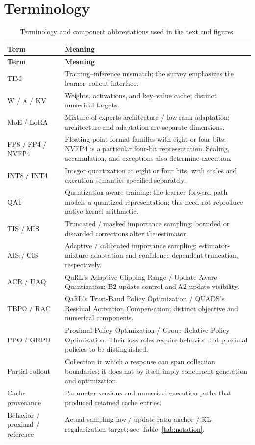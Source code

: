 \section{Terminology}\label{app:terms}
\begingroup\small
\begin{longtable}{@{}P{35mm}P{123mm}@{}}
\caption{Terminology and component abbreviations used in the text and figures.}\label{tab:terms}\\
\toprule {} \textbf{Term} & \textbf{Meaning}\\\midrule\endfirsthead
\toprule {} \textbf{Term} & \textbf{Meaning}\\\midrule\endhead
\bottomrule\endlastfoot
TIM & Training--inference mismatch; the survey emphasizes the learner--rollout interface.\\[4pt]
W / A / KV & Weights, activations, and key--value cache; distinct numerical targets.\\[4pt]
MoE / LoRA & Mixture-of-experts architecture / low-rank adaptation; architecture and adaptation are separate dimensions.\\[4pt]
FP8 / FP4 / NVFP4 & Floating-point format families with eight or four bits; NVFP4 is a particular four-bit representation. Scaling, accumulation, and exceptions also determine execution.\\[4pt]
INT8 / INT4 & Integer quantization at eight or four bits, with scales and execution semantics specified separately.\\[4pt]
QAT & Quantization-aware training: the learner forward path models a quantized representation; this need not reproduce native kernel arithmetic.\\[4pt]
TIS / MIS & Truncated / masked importance sampling; bounded or discarded corrections alter the estimator.\\[4pt]
AIS / CIS & Adaptive / calibrated importance sampling: estimator-mixture adaptation and confidence-dependent truncation, respectively.\\[4pt]
ACR / UAQ & QuRL's Adaptive Clipping Range / Update-Aware Quantization; B2 update control and A2 update visibility.\\[4pt]
TBPO / RAC & QaRL's Trust-Band Policy Optimization / QUADS's Residual Activation Compensation; distinct objective and numerical components.\\[4pt]
PPO / GRPO & Proximal Policy Optimization / Group Relative Policy Optimization. Their loss roles require behavior and proximal policies to be distinguished.\\[4pt]
Partial rollout & Collection in which a response can span collection boundaries; it does not by itself imply concurrent generation and optimization.\\[4pt]
Cache provenance & Parameter versions and numerical execution paths that produced retained cache entries.\\[4pt]
Behavior / proximal / reference & Actual sampling law / update-ratio anchor / KL-regularization target; see Table~\ref{tab:notation}.\\
\end{longtable}
\endgroup

